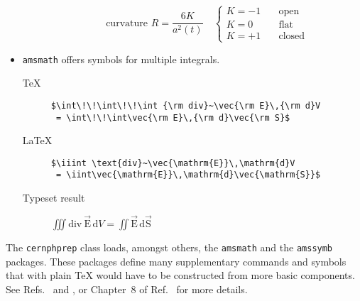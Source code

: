 \documentclass{cernphprep}
\begin{document}
\begin{itemize}
\begin{description}
\begin{minipage}[t]{.64\linewidth}
\[
\text{curvature } R = \frac{6K}{a^2(t)} \quad
\begin{cases}
K=-1\quad&\text{open}\\
K=0      &\text{flat}\\
K=+1     &\text{closed}
\end{cases}
\]
\end{minipage}
\end{description}
\item \texttt{amsmath} offers symbols for multiple integrals.
\begin{description}
\item[\TeX{}] \verb/$\int\!\!\int\!\!\int {\rm div}~\vec{\rm E}\,{\rm d}V/\\
              \verb/ = \int\!\!\int\vec{\rm E}\,{\rm d}\vec{\rm S}$/
\item[\LaTeX{}] \verb/$\iiint \text{div}~\vec{\mathrm{E}}\,\mathrm{d}V/\\
              \verb/ = \iint\vec{\mathrm{E}}\,\mathrm{d}\vec{\mathrm{S}}$/
\item[Typeset result] $\displaystyle\iiint \text{div}~\vec{\mathrm{E}}\,\mathrm{d}V
               = \iint\vec{\mathrm{E}}\,\mathrm{d}\vec{\mathrm{S}}$
\end{description}
\end{itemize}

The \texttt{cernphprep} class loads, amongst others, the
\texttt{amsmath} and the \texttt{amssymb} packages. These packages
define many supplementary commands and symbols that with plain \TeX{}
would have to be constructed from more basic components. See
Refs.~\cite{bib:voss2005} and \cite{bib:pakin2003}, or Chapter~8 of
Ref.~\cite{bib:mittelbach2004} for more details.
\end{document}
